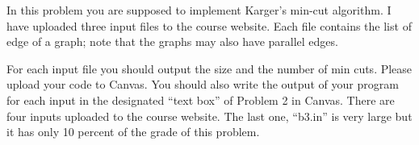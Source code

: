 \documentclass[10pt]{article}
\begin{document}
\maketitle

\begin{problem}[Problem 1]
In this problem you are supposed to implement Karger’s min-cut algorithm. I have uploaded three input
files to the course website. Each file contains the list of edge of a graph; note that the graphs may also
have parallel edges.

For each input file you should output the size and the number of min cuts. Please upload your code to
Canvas. You should also write the output of your program for each input in the designated ``text box''
of Problem 2 in Canvas. There are four inputs uploaded to the course website. The last one, ``b3.in'' is
very large but it has only 10 percent of the grade of this problem.
\end{problem}
\end{document}
